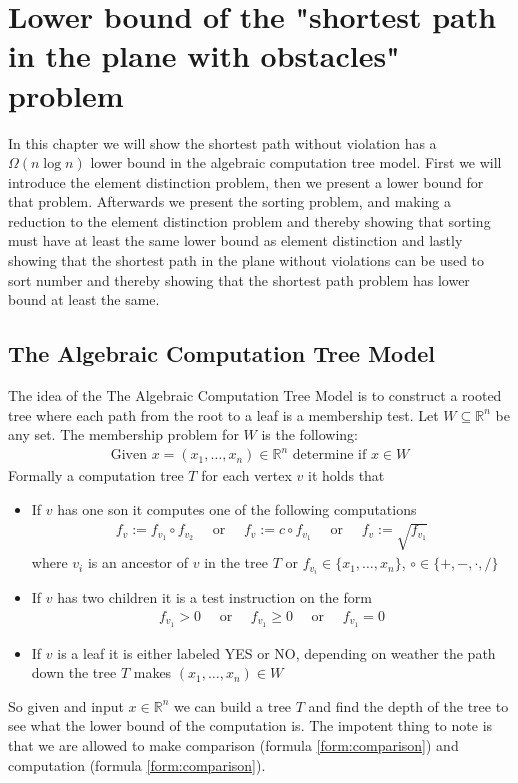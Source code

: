 \chapter{Lower bound of the "shortest path in the plane with obstacles" problem}
\label{chapter:lowerbound}
In this chapter we will show the shortest path without violation has a
$\Omega{(n\log n)}$ lower bound in the algebraic computation tree model.
First we will introduce the element distinction problem, then we present a
lower bound for that problem. Afterwards we present the sorting problem, and
making a reduction to the element distinction problem and thereby showing that
sorting must have at least the same lower bound as element distinction and
lastly showing that the shortest path in the plane without violations can be
used to sort number and thereby showing that the shortest path problem has
lower bound at least the same.
\section{The Algebraic Computation Tree Model}
The idea of the The Algebraic Computation Tree Model is to construct a rooted
tree where each path from the root to a leaf is a membership test.
Let $W \subseteq \mathbb{R}^n$ be any set. The membership problem for $W$ is
the following:
\begin{align}
	\text{Given } x = (x_1,\dots,x_n) \in \mathbb{R}^n \text{ determine if } x\in W
\end{align}
Formally a computation tree $T$ for each vertex $v$ it holds that
\begin{itemize}
  \item If $v$ has one son it computes one of the following computations
			\begin{align}
				f_v:=f_{v_1} \circ f_{v_2}\quad \text{ or }\quad
				f_v:=c \circ f_{v_1}\quad \text{ or }\quad
				f_v:=\sqrt{f_{v_1}}
				\label{form:computation}
			\end{align}
  	 where $v_i$ is an ancestor of $v$ in the tree $T$ or $f_{v_i}\in
  	 \{x_1,\dots,x_n\}$, $\circ \in \{+,-,\cdot,/\}$
   \item If $v$ has two children it is a test instruction on the form
		\begin{align}
			 f_{v_1}>0\quad \text{ or }\quad
			 f_{v_1}\geq 0\quad \text{ or }\quad
			 f_{v_1}= 0
			 \label{form:comparison}
		\end{align}
   \item If $v$ is a leaf it is either labeled YES or NO, depending on
  	 weather the path down the tree $T$ makes $(x_1,\dots,x_n)\in W$
\end{itemize}
So given and input $x\in \mathbb{R}^n$ we can build a tree $T$ and find the
depth of the tree to see what the lower bound of the computation is.
The impotent thing to note is that we are allowed to make comparison (formula
\ref{form:comparison}) and computation (formula \ref{form:comparison}).


